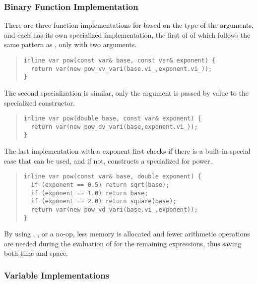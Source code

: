 \documentclass[10pt]{article}
\begin{document}
\subsubsection{Binary Function Implementation}

There are three function implementations for  based on the
type of the arguments, and each has its own specialized
implementation, the first of of which follows the same pattern as
, only with two arguments.
%
\begin{quote}
\begin{Verbatim}
inline var pow(const var& base, const var& exponent) {
  return var(new pow_vv_vari(base.vi_,exponent.vi_));
}
\end{Verbatim}
\end{quote}
%
The second specialization is similar, only the  argument
is passed by value to the specialized  constructor.
%
\begin{quote}
\begin{Verbatim}
inline var pow(double base, const var& exponent) {
  return var(new pow_dv_vari(base,exponent.vi_));
}
\end{Verbatim}
\end{quote}
%
The last implementation with a  exponent first checks if
there is a built-in special case that can be used, and if not,
constructs a specialized  for power.
%
\begin{quote}
\begin{Verbatim}
inline var pow(const var& base, double exponent) {
  if (exponent == 0.5) return sqrt(base);
  if (exponent == 1.0) return base;
  if (exponent == 2.0) return square(base);
  return var(new pow_vd_vari(base.vi_,exponent));
}
\end{Verbatim}
\end{quote}
%
By using , , or a no-op, less memory is
allocated and fewer arithmetic operations are needed during the
evaluation of  for the remaining expressions, thus
saving both time and space.

\subsubsection{Variable Implementations}
\end{document}
